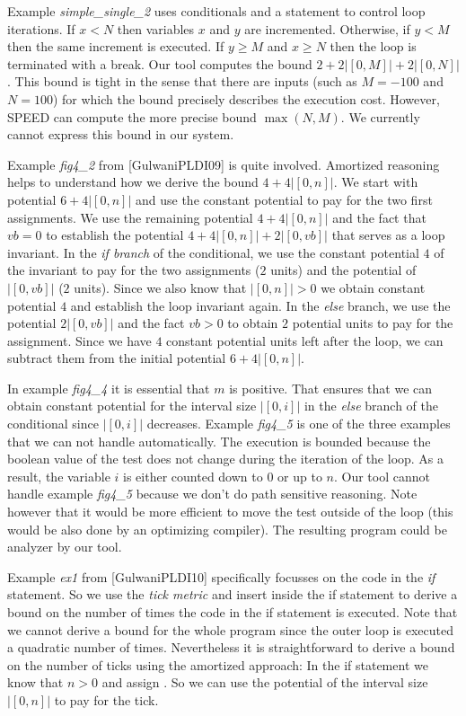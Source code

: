 \documentclass[nocopyrightspace,preprint]{sigplanconf}
\begin{document}
Example \emph{simple\_single\_2} uses conditionals and a 
statement to control loop iterations.  If $x<N$ then variables $x$ and
$y$ are incremented.  Otherwise, if $y<M$ then the same increment is
executed.  If $y\geq M$ and $x\geq N$ then the loop is terminated with
a break.  Our tool computes the bound $2 + 2 |[0, M]| + 2 |[0, N]|$.
This bound is tight in the sense that there are inputs (such as $M =
-100$ and $N = 100$) for which the bound precisely describes the
execution cost.  However, SPEED can compute the more precise bound
$\max(N,M)$.  We currently cannot express this bound in our system.

Example \emph{fig4\_2} from [GulwaniPLDI09] is quite involved.
Amortized reasoning helps to understand how we derive the bound $4 +
4|[0, n]|$.  We start with potential $6 + 4|[0, n]|$ and use the
constant potential to pay for the two first assignments.  We use the
remaining potential $4 + 4|[0, n]|$ and the fact that $vb=0$ to
establish the potential $4 + 4|[0, n]| + 2|[0,vb]|$ that serves as a
loop invariant.  In the \emph{if branch} of the conditional, we use
the constant potential $4$ of the invariant to pay for the two
assignments ($2$ units) and the potential of $|[0,vb]|$ ($2$ units).
Since we also know that $|[0, n]|>0$ we obtain constant potential $4$
and establish the loop invariant again.  In the \emph{else} branch, we
use the potential $2|[0,vb]|$ and the fact $vb>0$ to obtain $2$
potential units to pay for the assignment.  Since we have $4$ constant
potential units left after the loop, we can subtract them from the
initial potential $6 + 4|[0, n]|$.

In example \emph{fig4\_4} it is essential that $m$ is positive.
That ensures that we can obtain constant potential for the interval
size $|[0,i]|$ in the \emph{else} branch of the conditional since
$|[0,i]|$ decreases.  Example \emph{fig4\_5} is one of the three
examples that we can not handle automatically.  The execution is
bounded because the boolean value of the test  does not
change during the iteration of the loop.  As a result, the variable
$i$ is either counted down to $0$ or up to $n$.  Our tool cannot
handle example \emph{fig4\_5} because we don't do path sensitive
reasoning.  Note however that it would be more efficient to move the
test  outside of the loop (this would be also done by
an optimizing compiler).  The resulting program could be analyzer by our
tool.

Example \emph{ex1} from [GulwaniPLDI10] specifically focusses on the
code in the \emph{if} statement.  So we use the \emph{tick metric} and
insert  inside the if statement to derive a bound on
the number of times the code in the if statement is executed.  Note
that we cannot derive a bound for the whole program since the outer
loop is executed a quadratic number of times.  Nevertheless it is
straightforward to derive a bound on the number of ticks using the
amortized approach: In the if statement we know that $n>0$ and assign
.  So we can use the potential of the interval size $|[0,n]|$
to pay for the tick.
\end{document}
